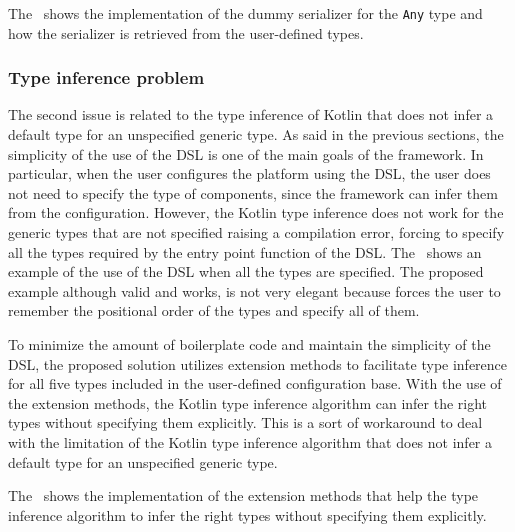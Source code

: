 

The~ shows the implementation of the dummy serializer for the \texttt{Any} type and how the serializer is retrieved from the
user-defined types.

\subsubsection{Type inference problem}

The second issue is related to the type inference of Kotlin that does not infer a default type for an unspecified generic type.
As said in the previous sections, the simplicity of the use of the DSL is one of the main goals of the framework. In particular, when the user
configures the platform using the DSL, the user does not need to specify the type of components, since the framework can infer them from the
configuration. However, the Kotlin type inference does not work for the generic types that are not specified raising a compilation error, forcing
to specify all the types required by the entry point function of the DSL. The~ shows an example of the use of the
DSL when all the types are specified. The proposed example although valid and works, is not very elegant because forces the user to remember
the positional order of the types and specify all of them.



To minimize the amount of boilerplate code and maintain the simplicity of the DSL, the proposed solution utilizes extension methods to
facilitate type inference for all five types included in the user-defined configuration base.
With the use of the extension methods, the Kotlin type inference algorithm can infer the right types without specifying them explicitly.
This is a sort of workaround to deal with the limitation of the Kotlin type inference algorithm that does not infer a default type for an
unspecified generic type.



The~ shows the implementation of the extension methods that help the type inference algorithm to infer the
right types without specifying them explicitly.
